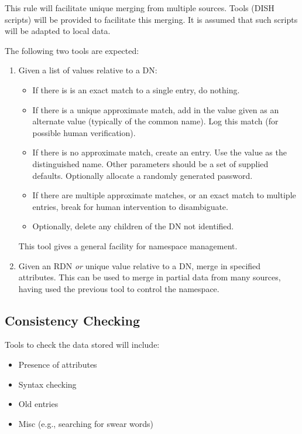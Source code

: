 This rule will facilitate unique merging from multiple sources.  Tools (DISH
scripts) will be provided to facilitate this merging.  It is assumed that
such scripts will be adapted to local data.  

The following two tools are expected:

\begin {enumerate}
\item Given a list of values relative to a DN:
\begin {itemize}
\item If there is is an exact match to a single entry, do nothing.
\item If there is a unique approximate match, add in the value given as an
alternate value (typically of the common name).  Log this match (for 
possible human verification).
\item If there is no approximate match, create an entry.  Use the value as
the distinguished name.  Other parameters should be a set of supplied
defaults.  Optionally allocate a randomly generated password.
\item If there are multiple approximate matches, or an exact match to
multiple entries, break for human intervention
to disambiguate.
\item  Optionally, delete any children of the DN not identified.
\end {itemize}
This tool gives a general facility for namespace management.

\item Given an RDN {\em or} unique value relative to a DN, merge in
specified attributes.  This can be used to merge in partial data from many
sources, having used the previous tool to control the namespace.

\end {enumerate}




\subsection {Consistency Checking}

Tools to check the data stored will include:

\begin {itemize}
\item Presence of attributes
\item Syntax checking
\item Old entries
\item Misc (e.g., searching for swear words)
\end {itemize}


